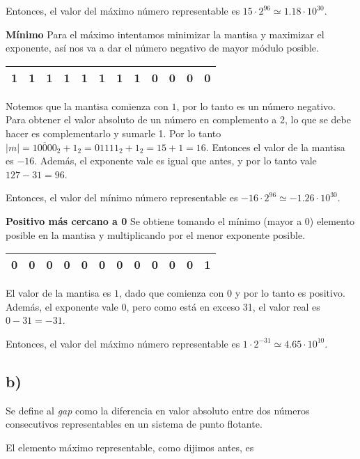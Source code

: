 \documentclass[hidelinks,a4paper,10pt, nofootinbib]{article}
\begin{document}
Entonces, el valor del máximo número representable es $15 \cdot 2^{96} \simeq 1.18 \cdot 10^{30}$.


\textbf{Mínimo} Para el máximo intentamos minimizar la mantisa y maximizar el exponente, así nos va a dar el número negativo de mayor módulo posible.
\begin{center}
\begin{tabular}{|c|c|c|c|c|c|c||c|c|c|c|c|}
\hline
1&1&1&1&1&1&1&1&0&0&0&0\\
\hline
\end{tabular}
\end{center}
Notemos que la mantisa comienza con $1$, por lo tanto es un número negativo. Para obtener el valor absoluto de un número en complemento a 2, lo que se debe hacer es complementarlo y sumarle 1. Por lo tanto $|m| = \overline{10000}_2 + 1_2 = 01111_2 + 1_2 = 15 + 1 = 16$. Entonces el valor de la mantisa es $-16$. Además, el exponente vale es igual que antes, y por lo tanto vale $127 - 31 = 96$.



Entonces, el valor del mínimo número representable es $-16 \cdot 2^{96} \simeq -1.26 \cdot 10^{30}$.

\textbf{Positivo más cercano a 0} Se obtiene tomando el mínimo (mayor a 0) elemento posible en la mantisa y multiplicando por el menor exponente posible.

\begin{center}
\begin{tabular}{|c|c|c|c|c|c|c||c|c|c|c|c|}
\hline
0&0&0&0&0&0&0&0&0&0&0&1\\
\hline
\end{tabular}
\end{center}

El valor de la mantisa es $1$, dado que comienza con $0$ y por lo tanto es positivo.
Además, el exponente vale $0$, pero como está en exceso 31, el valor real es $0 - 31 = -31$.

Entonces, el valor del máximo número representable es $1 \cdot 2^{-31} \simeq 4.65 \cdot 10^{10}$.

\subsection*{b)}
Se define al \emph{gap} como la diferencia en valor absoluto entre dos números consecutivos representables en un sistema de punto flotante.


El elemento máximo representable, como dijimos antes, es
\end{document}
